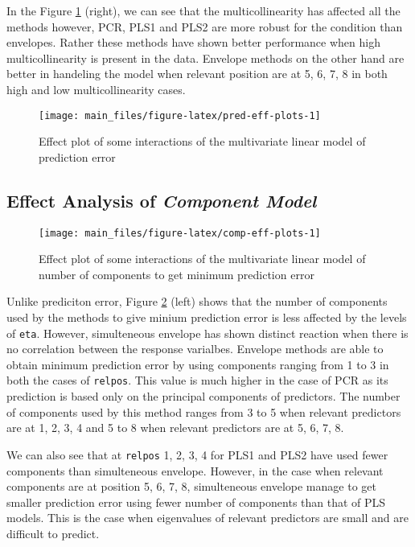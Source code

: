 \documentclass[12pt,3p,authoryear]{elsarticle}
\begin{document}
In the Figure \ref{fig:pred-eff-plots} (right), we can see that the
multicollinearity has affected all the methods however, PCR, PLS1 and
PLS2 are more robust for the condition than envelopes. Rather these
methods have shown better performance when high multicollinearity is
present in the data. Envelope methods on the other hand are better in
handeling the model when relevant position are at 5, 6, 7, 8 in both
high and low multicollinearity cases.




\begin{figure}
\texttt{[image: main\_files/figure-latex/pred-eff-plots-1]} \caption{Effect plot of some interactions of the multivariate
linear model of prediction error}\label{fig:pred-eff-plots}
\end{figure}

\hypertarget{effect-analysis-of-component-model}{%
\subsection{\texorpdfstring{Effect Analysis of \emph{Component
Model}}{Effect Analysis of Component Model}}\label{effect-analysis-of-component-model}}




\begin{figure}
\texttt{[image: main\_files/figure-latex/comp-eff-plots-1]} \caption{Effect plot of some interactions of the multivariate
linear model of number of components to get minimum prediction error}\label{fig:comp-eff-plots}
\end{figure}

Unlike prediciton error, Figure \ref{fig:comp-eff-plots} (left) shows
that the number of components used by the methods to give minium
prediction error is less affected by the levels of \texttt{eta}.
However, simulteneous envelope has shown distinct reaction when there is
no correlation between the response varialbes. Envelope methods are able
to obtain minimum prediction error by using components ranging from 1 to
3 in both the cases of \texttt{relpos}. This value is much higher in the
case of PCR as its prediction is based only on the principal components
of predictors. The number of components used by this method ranges from
3 to 5 when relevant predictors are at 1, 2, 3, 4 and 5 to 8 when
relevant predictors are at 5, 6, 7, 8.

We can also see that at \texttt{relpos} 1, 2, 3, 4 for PLS1 and PLS2
have used fewer components than simulteneous envelope. However, in the
case when relevant components are at position 5, 6, 7, 8, simulteneous
envelope manage to get smaller prediction error using fewer number of
components than that of PLS models. This is the case when eigenvalues of
relevant predictors are small and are difficult to predict.
\end{document}
